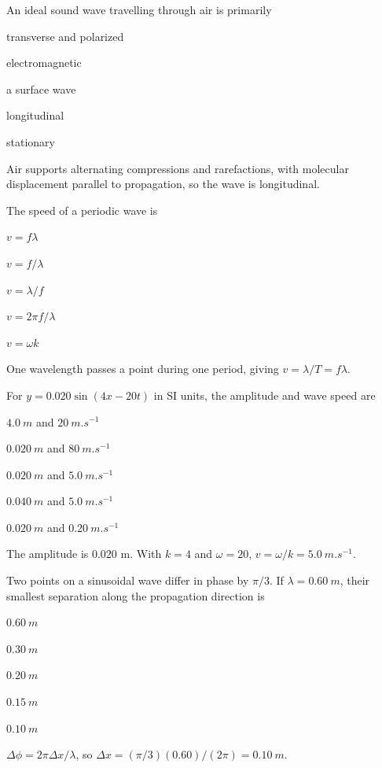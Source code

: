 \documentclass[10pt,a4paper,full]{physicsquiz}
\newcommand{\bankq}[9]{%
  \begin{quizquestion}[
    id=#1,
    topic={#2},
    difficulty=#3,
    marks=1,
    correct=#4,
    tags={#5},
    outcome={#6}
  ]
    #7
    \begin{choiceoptions}
      #8
    \end{choiceoptions}
  \end{quizquestion}
  \begin{quizsolution}
    #9
  \end{quizsolution}
}
\begin{document}
\begin{quizbank}
\bankq{waves-047}{Wave Properties and Classification}{foundation}{D}{waves,classification,sound}{Classify sound in a fluid.}{%
An ideal sound wave travelling through air is primarily}{%
\item transverse and polarized
\item electromagnetic
\item a surface wave
\item longitudinal
\item stationary}{%
Air supports alternating compressions and rarefactions, with molecular displacement parallel to propagation, so the wave is longitudinal.}

\bankq{waves-048}{Wave Properties and Classification}{foundation}{A}{waves,parameters}{Relate speed, frequency, and wavelength.}{%
The speed of a periodic wave is}{%
\item \(v=f\lambda\)
\item \(v=f/\lambda\)
\item \(v=\lambda/f\)
\item \(v=2\pi f/\lambda\)
\item \(v=\omega k\)}{%
One wavelength passes a point during one period, giving \(v=\lambda/T=f\lambda\).}

\bankq{waves-049}{Wave Properties and Classification}{applied}{C}{waves,wavefunction}{Extract wave parameters from a sinusoidal wave.}{%
For \(y=0.020\sin(4x-20t)\) in SI units, the amplitude and wave speed are}{%
\item \(\SI{4.0}{m}\) and \(\SI{20}{m.s^{-1}}\)
\item \(\SI{0.020}{m}\) and \(\SI{80}{m.s^{-1}}\)
\item \(\SI{0.020}{m}\) and \(\SI{5.0}{m.s^{-1}}\)
\item \(\SI{0.040}{m}\) and \(\SI{5.0}{m.s^{-1}}\)
\item \(\SI{0.020}{m}\) and \(\SI{0.20}{m.s^{-1}}\)}{%
The amplitude is \(0.020\) m. With \(k=4\) and \(\omega=20\), \(v=\omega/k=\SI{5.0}{m.s^{-1}}\).}

\bankq{waves-050}{Wave Properties and Classification}{applied}{E}{waves,phase}{Calculate separation from phase difference.}{%
Two points on a sinusoidal wave differ in phase by \(\pi/3\). If \(\lambda=\SI{0.60}{m}\), their smallest separation along the propagation direction is}{%
\item \(\SI{0.60}{m}\)
\item \(\SI{0.30}{m}\)
\item \(\SI{0.20}{m}\)
\item \(\SI{0.15}{m}\)
\item \(\SI{0.10}{m}\)}{%
\(\Delta\phi=2\pi\Delta x/\lambda\), so \(\Delta x=(\pi/3)(0.60)/(2\pi)=\SI{0.10}{m}\).}


\end{quizbank}
\end{document}
